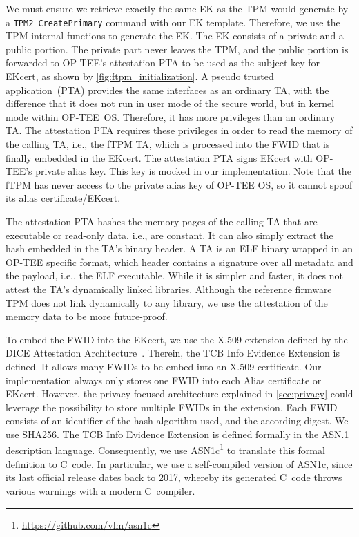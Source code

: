 We must ensure we retrieve exactly the same EK as the TPM would generate by a \texttt{TPM2\_CreatePrimary} command with our EK template.
Therefore, we use the TPM internal functions to generate the EK\@.
The EK consists of a private and a public portion.
The private part never leaves the TPM, and the public portion is forwarded to OP-TEE's attestation PTA to be used as the subject key for EKcert, as shown by \autoref{fig:ftpm_initialization}.
A pseudo trusted application~(PTA) provides the same interfaces as an ordinary TA, with the difference that it does not run in user mode of the secure world, but in kernel mode within OP-TEE~OS\@.
Therefore, it has more privileges than an ordinary TA\@.
The attestation PTA requires these privileges in order to read the memory of the calling TA, i.e., the fTPM TA, which is processed into the FWID that is finally embedded in the EKcert.
The attestation PTA signs EKcert with OP-TEE's private alias key.
This key is mocked in our implementation.
Note that the fTPM has never access to the private alias key of OP-TEE OS, so it cannot spoof its alias certificate/EKcert.

The attestation PTA hashes the memory pages of the calling TA that are executable or read-only data, i.e., are constant.
It can also simply extract the hash embedded in the TA's binary header.
A TA is an ELF binary wrapped in an OP-TEE specific format, which header contains a signature over all metadata and the payload, i.e., the ELF executable.
While it is simpler and faster, it does not attest the TA's dynamically linked libraries.
Although the reference firmware TPM does not link dynamically to any library, we use the attestation of the memory data to be more future-proof.

To embed the FWID into the EKcert, we use the X.509 extension defined by the DICE Attestation Architecture~\cite{TCGAttestation2021}.
Therein, the TCB Info Evidence Extension is defined.
It allows many FWIDs to be embed into an X.509 certificate.
Our implementation always only stores one FWID into each Alias certificate or EKcert.
However, the privacy focused architecture explained in \autoref{sec:privacy} could leverage the possibility to store multiple FWIDs in the extension.
Each FWID consists of an identifier of the hash algorithm used, and the according digest.
We use SHA256.
The TCB Info Evidence Extension is defined formally in the ASN.1 description language.
Consequently, we use ASN1c\footnote{\url{https://github.com/vlm/asn1c}} to translate this formal definition to C~code.
In particular, we use a self-compiled version of ASN1c, since its last official release dates back to 2017, whereby its generated C~code throws various warnings with a modern C~compiler.

